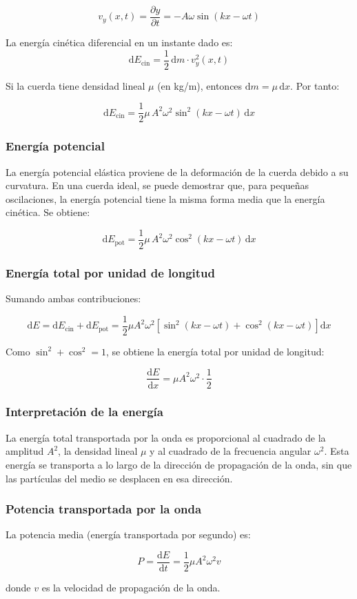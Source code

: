 \[
v_y(x,t) = \frac{\partial y}{\partial t} = -A \omega \sin(kx - \omega t)
\]

La energía cinética diferencial en un instante dado es:
\[
\mathrm{d}E_{\text{cin}} = \frac{1}{2} \, \mathrm{d}m \cdot v_y^2(x,t)
\]

Si la cuerda tiene densidad lineal \(\mu\) (en kg/m), entonces \(\mathrm{d}m = \mu \, \mathrm{d}x\). Por tanto:

\[
\mathrm{d}E_{\text{cin}} = \frac{1}{2} \mu \, A^2 \omega^2 \sin^2(kx - \omega t) \, \mathrm{d}x
\]

\subsubsection{Energía potencial}

La energía potencial elástica proviene de la deformación de la cuerda debido a su curvatura. En una cuerda ideal, se puede demostrar que, para pequeñas oscilaciones, la energía potencial tiene la misma forma media que la energía cinética. Se obtiene:

\[
\mathrm{d}E_{\text{pot}} = \frac{1}{2} \mu \, A^2 \omega^2 \cos^2(kx - \omega t) \, \mathrm{d}x
\]

\subsubsection{Energía total por unidad de longitud}

Sumando ambas contribuciones:

\[
\mathrm{d}E = \mathrm{d}E_{\text{cin}} + \mathrm{d}E_{\text{pot}} = \frac{1}{2} \mu A^2 \omega^2 \left[ \sin^2(kx - \omega t) + \cos^2(kx - \omega t) \right] \mathrm{d}x
\]

Como \(\sin^2 + \cos^2 = 1\), se obtiene la energía total por unidad de longitud:

\[
\frac{\mathrm{d}E}{\mathrm{d}x} = \mu A^2 \omega^2 \cdot \frac{1}{2}
\]


\subsubsection{Interpretación de la energía}

La energía total transportada por la onda es proporcional al cuadrado de la amplitud \(A^2\), la densidad lineal \(\mu\) y al cuadrado de la frecuencia angular \(\omega^2\). Esta energía se transporta a lo largo de la dirección de propagación de la onda, sin que las partículas del medio se desplacen en esa dirección.

\subsubsection{Potencia transportada por la onda}

La potencia media (energía transportada por segundo) es:

\[
P = \frac{\mathrm{d}E}{\mathrm{d}t} = \frac{1}{2} \mu A^2 \omega^2 v
\]

donde \(v\) es la velocidad de propagación de la onda.